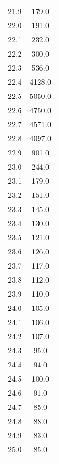 \begin{table}
{\begin{tabular}{S S}
        21.9 & 179.0 \\
        22.0 & 191.0 \\
        22.1 & 232.0 \\
        22.2 & 300.0 \\
        22.3 & 536.0 \\
        22.4 & 4128.0 \\
        22.5 & 5050.0 \\
        22.6 & 4750.0 \\
        22.7 & 4571.0 \\
        22.8 & 4097.0 \\
        22.9 & 901.0 \\
        23.0 & 244.0 \\
        23.1 & 179.0 \\
        23.2 & 151.0 \\
        23.3 & 145.0 \\
        23.4 & 130.0 \\
        23.5 & 121.0 \\
        23.6 & 126.0 \\
        23.7 & 117.0 \\
        23.8 & 112.0 \\
        23.9 & 110.0 \\
        24.0 & 105.0 \\
        24.1 & 106.0 \\
        24.2 & 107.0 \\
        24.3 & 95.0 \\
        24.4 & 94.0 \\
        24.5 & 100.0 \\
        24.6 & 91.0 \\
        24.7 & 85.0 \\
        24.8 & 88.0 \\
        24.9 & 83.0 \\
        25.0 & 85.0 \\
        & \\
        \bottomrule
    \end{tabular}
    }
    \label{tab:emission}
\end{table}

